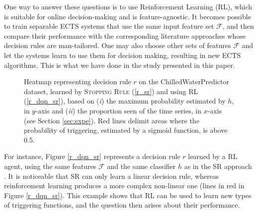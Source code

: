 \documentclass[sigconf, nonacm, table]{acmart}
\begin{document}
One way to answer these questions is to use Reinforcement Learning (RL), which is suitable for online decision-making and is feature-agnostic.
It becomes possible to train separable ECTS systems that use the same input feature set $\mathcal{F}$, and then compare their performance with the corresponding literature approaches whose decision rules are man-tailored. One may also choose other sets of features $\mathcal{F}$ and let the systems learn to use them for decision making, resulting in new ECTS algorithms. 
This is what we have done in the study presented in this paper.

\begin{figure}[!htb]
    \centering
    \caption{Heatmap representing decision rule $r$ on the ChilledWaterPredictor dataset, learned by \textsc{Stopping Rule} (\protect\ref{r_sr}) and using RL (\protect\ref{r_dqn_sr}), based on (\textit{i}) the maximum probability estimated by $h$, in $y$-axis and (\textit{ii}) the proportion seen of the time series, in $x$-axis (see Section \ref{sec:expe}). Red lines delimit areas where the probability of triggering, estimated by a sigmoid function, is above 0.5. %
    }
    \label{fig:motivation_example}
\end{figure}

For instance, Figure \ref{r_dqn_sr} represents a decision rule $r$ learned by a RL agent, using the same features $\mathcal{F}$ and the same classifier $h$ as in the SR approach \cite{mori2017early}. 
It is noticeable that SR can only learn a linear decision rule, whereas reinforcement learning produces a more complex non-linear one (lines in red in Figure \ref{r_dqn_sr}). 
This example shows that RL can be used to learn new types of triggering functions, and the question then arises about their performance.
\end{document}
